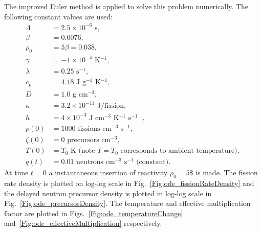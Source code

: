 The improved Euler method is applied to solve this problem numerically. The following constant values are used:
\begin{align}
  \Lambda  &= 2.5 \times 10^{-6} \text{ s}, \nonumber \\
  \beta    &= 0.0076, \nonumber \\
  \rho_0   &= 5 \beta = 0.038, \nonumber \\
  \gamma   &= -1 \times 10^{-4} \text{ K$^{-1}$}, \nonumber \\
  \lambda  &= 0.25 \text{ s$^{-1}$}, \nonumber \\
  c_p      &= 4.18 \text{ J g$^{-1}$ K$^{-1}$},  \nonumber \\
  D        &= 1.0 \text{ g cm$^{-3}$}, \nonumber \\
  \kappa   &= 3.2 \times 10^{-11} \text{ J/fission}, \nonumber \\
  h        &= 4 \times 10^{-3} \text{ J cm$^{-3}$ K$^{-1}$ s$^{-1}$ }, \nonumber \\
  p(0)     &= 1000 \text{ fissions cm$^{-3}$ s$^{-1}$}, \nonumber \\
  \zeta(0) &= 0 \text{ precursors cm$^{-3}$}, \nonumber \\
  T(0)     &= T_0 \text{ K (note $T = T_0$ corresponds to ambient temperature)}, \nonumber \\
  q(t)     &= 0.01 \text{ neutrons cm$^{-3}$ s$^{-1}$ (constant)}. \nonumber
\end{align}
At time $t = 0$ a instantaneous insertion of reactivity $\rho_0 = 5\$$ is made. The fission rate density is plotted on log-log scale in Fig.~\ref{Fig:ode_fissionRateDensity} and the delayed neutron precursor density is plotted in log-log scale in Fig.~\ref{Fig:ode_precursorDensity}. The temperature and effective multiplication factor are plotted in Figs.~\ref{Fig:ode_temperatureChange} and~\ref{Fig:ode_effectiveMultiplication} respectively.

